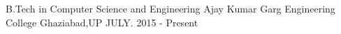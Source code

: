 

\begin{cventries}

  \cventry
    {B.Tech in Computer Science and Engineering} %
    {Ajay Kumar Garg Engineering College} %
    {Ghaziabad,UP} %
    {JULY. 2015 - Present} %
    {
    }
    

\end{cventries}

